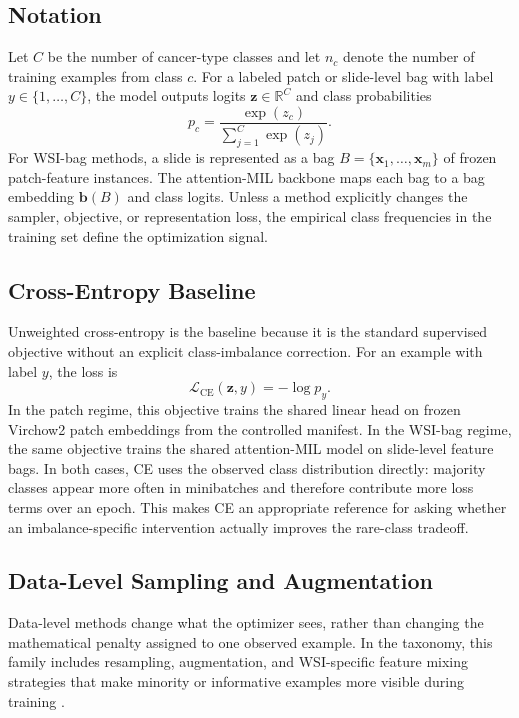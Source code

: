 \documentclass[11pt]{article}
\begin{document}
\subsection{Notation}
Let $C$ be the number of cancer-type classes and let $n_c$ denote the number of training examples from class $c$. For a labeled patch or slide-level bag with label $y\in\{1,\ldots,C\}$, the model outputs logits $\mathbf{z}\in\mathbb{R}^{C}$ and class probabilities
\begin{equation}
  p_c = \frac{\exp(z_c)}{\sum_{j=1}^{C}\exp(z_j)}.
  \label{eq:softmax}
\end{equation}
For WSI-bag methods, a slide is represented as a bag $B=\{\mathbf{x}_1,\ldots,\mathbf{x}_m\}$ of frozen patch-feature instances. The attention-MIL backbone maps each bag to a bag embedding $\mathbf{b}(B)$ and class logits. Unless a method explicitly changes the sampler, objective, or representation loss, the empirical class frequencies in the training set define the optimization signal.

\subsection{Cross-Entropy Baseline}
Unweighted cross-entropy is the baseline because it is the standard supervised objective without an explicit class-imbalance correction. For an example with label $y$, the loss is
\begin{equation}
  \mathcal{L}_{\mathrm{CE}}(\mathbf{z},y) = -\log p_y.
  \label{eq:ce}
\end{equation}
In the patch regime, this objective trains the shared linear head on frozen Virchow2 patch embeddings from the controlled manifest. In the WSI-bag regime, the same objective trains the shared attention-MIL model on slide-level feature bags. In both cases, CE uses the observed class distribution directly: majority classes appear more often in minibatches and therefore contribute more loss terms over an epoch. This makes CE an appropriate reference for asking whether an imbalance-specific intervention actually improves the rare-class tradeoff.

\subsection{Data-Level Sampling and Augmentation}
Data-level methods change what the optimizer sees, rather than changing the mathematical penalty assigned to one observed example. In the taxonomy, this family includes resampling, augmentation, and WSI-specific feature mixing strategies that make minority or informative examples more visible during training \citep{saini2023tacklingClass}.
\end{document}
